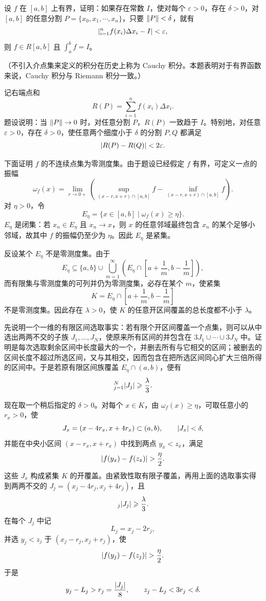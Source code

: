 \begin{xreferenceproblem}[3]
设 $f$ 在 $[a,b]$ 上有界，证明：如果存在常数 $I$，使对每个 $\varepsilon>0$，存在 $\delta>0$，对 $[a,b]$ 的任意分割 $P=\{x_0,x_1,\cdots,x_n\}$，只要 $\norm{P}<\delta$，就有
\[
  \abs*{\sum_{i=1}^n f(x_i)\Delta x_i-I}<\varepsilon,
\]
则 $f\in R[a,b]$ 且 $\int_a^b f=I$。

（不引入介点集来定义的积分在历史上称为 Cauchy 积分。本题表明对于有界函数来说，Cauchy 积分与 Riemann 积分一致。）
\end{xreferenceproblem}
\begin{xsolution}
记右端点和
\[
  R(P)=\sum_{i=1}^n f(x_i)\Delta x_i.
\]
题设说明：当 $\norm P\to0$ 时，对任意分割 $P$，$R(P)$ 一致趋于 $I$。特别地，对任意 $\varepsilon>0$，存在 $\delta>0$，使任意两个细度小于 $\delta$ 的分割 $P,Q$ 都满足
\[
  \abs{R(P)-R(Q)}<2\varepsilon.
\]

下面证明 $f$ 的不连续点集为零测度集。由于题设已经假定 $f$ 有界，可定义一点的振幅
\[
  \omega_f(x)=\lim_{r\to0+}
  \left(\sup_{(x-r,x+r)\cap[a,b]}f-
  \inf_{(x-r,x+r)\cap[a,b]}f\right).
\]
对 $\eta>0$，令
\[
  E_\eta=\{x\in[a,b]\mid\omega_f(x)\geqslant\eta\}.
\]
$E_\eta$ 是闭集：若 $x_n\in E_\eta$ 且 $x_n\to x$，则 $x$ 的任意邻域最终包含 $x_n$ 的某个足够小邻域，故其中 $f$ 的振幅仍至少为 $\eta$。因此 $E_\eta$ 是紧集。

反设某个 $E_\eta$ 不是零测度集。由于
\[
  E_\eta\subseteq\{a,b\}\cup
  \bigcup_{m=1}^\infty
  \left(E_\eta\cap\left[a+\frac1m,b-\frac1m\right]\right),
\]
而有限集与零测度集的可列并仍为零测度集，必存在某个 $m$，使紧集
\[
  K=E_\eta\cap\left[a+\frac1m,b-\frac1m\right]
\]
不是零测度集。因此存在 $\lambda>0$，使 $K$ 的任意开区间覆盖的总长度都不小于 $\lambda$。

先说明一个一维的有限区间选取事实：若有限个开区间覆盖一个点集，则可以从中选出两两不交的子族 $J_1,\ldots,J_N$，使原来所有区间的并包含在 $3J_1\cup\cdots\cup3J_N$ 中。证明是每次选取剩余区间中长度最大的一个，并删去所有与它相交的区间；被删去的区间长度不超过所选区间，又与其相交，因而包含在把所选区间同心扩大三倍所得的区间中。于是若原有限区间族覆盖 $E_\eta\cap(a,b)$，便有
\[
  \sum_{j=1}^N\abs{J_j}\geqslant\frac\lambda3.
\]

现在取一个稍后指定的 $\delta>0$。对每个 $x\in K$，由 $\omega_f(x)\geqslant\eta$，可取任意小的 $r_x>0$，使
\[
  J_x=(x-4r_x,x+4r_x)\subset(a,b),
  \qquad \abs{J_x}<\delta,
\]
并能在中央小区间 $(x-r_x,x+r_x)$ 中找到两点 $y_x<z_x$，满足
\[
  \abs{f(y_x)-f(z_x)}>\frac\eta2.
\]
这些 $J_x$ 构成紧集 $K$ 的开覆盖。由紧致性取有限子覆盖，再用上面的选取事实得到两两不交的 $J_j=(x_j-4r_j,x_j+4r_j)$，且
\[
  \sum_j\abs{J_j}\geqslant\frac\lambda3.
\]
在每个 $J_j$ 中记
\[
  L_j=x_j-2r_j,
\]
并选 $y_j<z_j$ 于 $(x_j-r_j,x_j+r_j)$，使
\[
  \abs{f(y_j)-f(z_j)}>\frac\eta2.
\]
于是
\[
  y_j-L_j>r_j=\frac{\abs{J_j}}8,
  \qquad
  z_j-L_j<3r_j<\delta.
\]


\end{xsolution}
